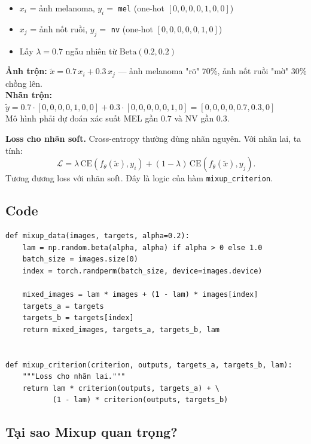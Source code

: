 \documentclass[11pt,a4paper]{article}
\begin{document}
\begin{example}
\begin{itemize}[leftmargin=*]
  \item $x_i$ = ảnh melanoma, $y_i = $ \texttt{mel} (one-hot $[0,0,0,0,1,0,0]$)
  \item $x_j$ = ảnh nốt ruồi, $y_j = $ \texttt{nv} (one-hot $[0,0,0,0,0,1,0]$)
  \item Lấy $\lambda = 0.7$ ngẫu nhiên từ $\mathrm{Beta}(0.2, 0.2)$
\end{itemize}
\textbf{Ảnh trộn:} $\tilde{x} = 0.7 \, x_i + 0.3 \, x_j$ --- ảnh melanoma "rõ" 70\%, ảnh nốt ruồi "mờ" 30\% chồng lên.\\
\textbf{Nhãn trộn:} $\tilde{y} = 0.7 \cdot [0,0,0,0,1,0,0] + 0.3 \cdot [0,0,0,0,0,1,0] = [0,0,0,0,\mathbf{0.7},\mathbf{0.3},0]$\\
Mô hình phải dự đoán xác suất MEL gần $0.7$ và NV gần $0.3$.
\end{example}

\begin{note}
\textbf{Loss cho nhãn soft.} Cross-entropy thường dùng nhãn nguyên. Với nhãn lai, ta tính:
\[
  \mathcal{L} = \lambda \, \mathrm{CE}(f_\theta(\tilde{x}), y_i) + (1-\lambda) \, \mathrm{CE}(f_\theta(\tilde{x}), y_j).
\]
Tương đương loss với nhãn soft. Đây là logic của hàm \texttt{mixup\_criterion}.
\end{note}

\subsection{Code}

\begin{lstlisting}[caption={\texttt{src/data/mixup.py} --- hàm \texttt{mixup\_data}}]
def mixup_data(images, targets, alpha=0.2):
    lam = np.random.beta(alpha, alpha) if alpha > 0 else 1.0
    batch_size = images.size(0)
    index = torch.randperm(batch_size, device=images.device)

    mixed_images = lam * images + (1 - lam) * images[index]
    targets_a = targets
    targets_b = targets[index]
    return mixed_images, targets_a, targets_b, lam


def mixup_criterion(criterion, outputs, targets_a, targets_b, lam):
    """Loss cho nhãn lai."""
    return lam * criterion(outputs, targets_a) + \
           (1 - lam) * criterion(outputs, targets_b)
\end{lstlisting}

\subsection{Tại sao Mixup quan trọng?}
\end{document}
